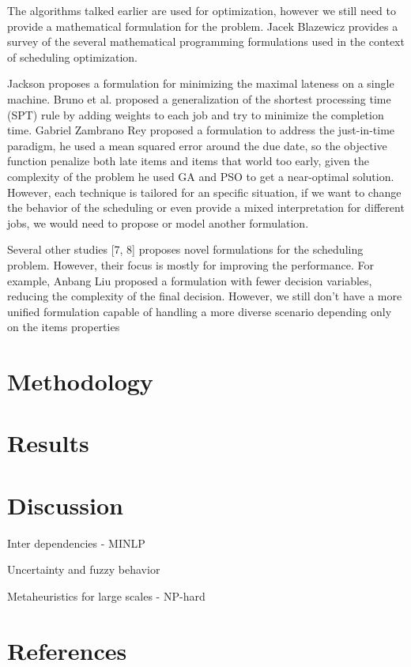 \documentclass[12pt]{article}
\begin{document}
The algorithms talked earlier are used for optimization, however we still need to provide a mathematical formulation for the problem. Jacek Blazewicz provides a survey of the several mathematical programming formulations used in the context of scheduling optimization. 

Jackson proposes a formulation for minimizing the maximal lateness on a single
machine. Bruno et al. proposed a generalization of the shortest processing time (SPT) rule by adding weights to each job and try to minimize the completion time. Gabriel Zambrano Rey proposed a formulation to address the just-in-time paradigm, he used a mean squared error around the due date, so the objective function penalize both late items and items that world too early, given the complexity of the problem he used GA and PSO to get a near-optimal solution. However, each technique is tailored for an specific situation, if we want to change the behavior of the scheduling or even provide a mixed interpretation for different jobs, we would need to propose or model another formulation.

Several other studies [7, 8] proposes novel formulations for the scheduling problem. However, their focus is mostly for improving the performance. For example, Anbang Liu proposed a formulation with fewer decision variables, reducing the complexity of the final decision. However, we still  don't have a more unified formulation capable of handling a more diverse scenario depending only on the items properties

\section*{Methodology}



\section*{Results}



\section*{Discussion}

Inter dependencies - MINLP

Uncertainty and fuzzy behavior

Metaheuristics for large scales - NP-hard

\section*{References}
\end{document}
